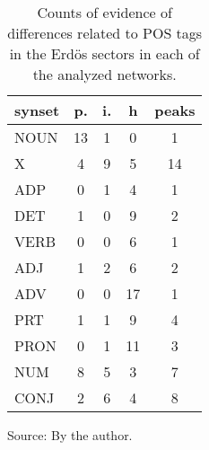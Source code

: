 \begin{table}[h!]
\begin{center}
\caption{Counts of evidence of differences related to POS tags in the Erd\"os sectors in each of the analyzed networks.}
\begin{tabular}{| l || c | c | c || c |}\hline
{\bf synset} & {\bf p.} & {\bf i.} & {\bf h} & {\bf peaks} \\\hline\hline
NOUN & 13  & 1  & 0  & 1 \\
X & 4  & 9  & 5  & 14 \\\hline
ADP & 0  & 1  & 4  & 1 \\
DET & 1  & 0  & 9  & 2 \\\hline
VERB & 0  & 0  & 6  & 1 \\\hline
ADJ & 1  & 2  & 6  & 2 \\
ADV & 0  & 0  & 17  & 1 \\\hline
PRT & 1  & 1  & 9  & 4 \\
PRON & 0  & 1  & 11  & 3 \\
NUM & 8  & 5  & 3  & 7 \\
CONJ & 2  & 6  & 4  & 8 \\\hline
\end{tabular}
\begin{flushleft}
		Source: By the author.\
\end{flushleft}
\end{center}
\end{table}
